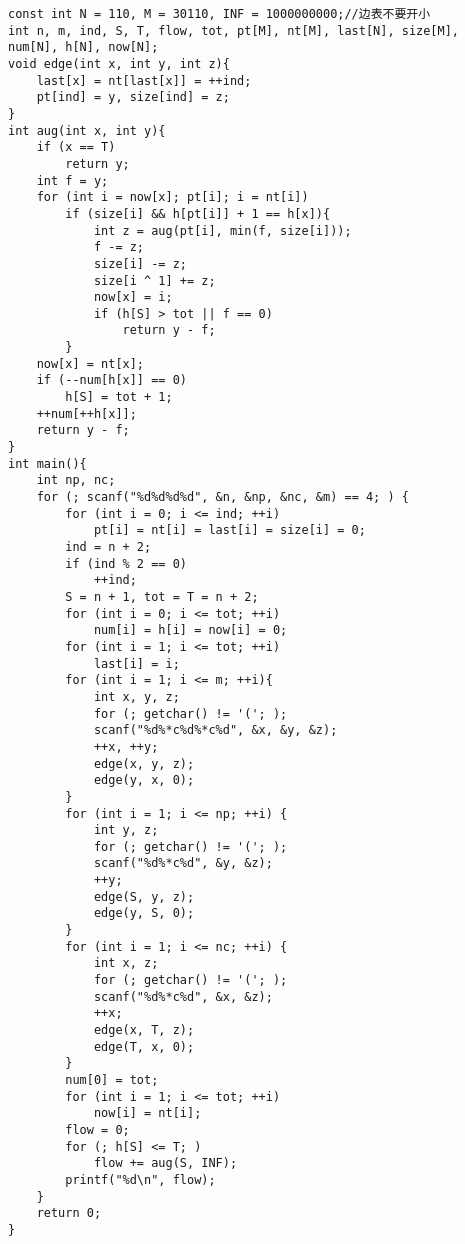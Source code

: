 \begin{lstlisting}
const int N = 110, M = 30110, INF = 1000000000;//边表不要开小
int n, m, ind, S, T, flow, tot, pt[M], nt[M], last[N], size[M], num[N], h[N], now[N];
void edge(int x, int y, int z){
	last[x] = nt[last[x]] = ++ind;
	pt[ind] = y, size[ind] = z;
}
int aug(int x, int y){
	if (x == T)
		return y;
	int f = y;
	for (int i = now[x]; pt[i]; i = nt[i])
		if (size[i] && h[pt[i]] + 1 == h[x]){
			int z = aug(pt[i], min(f, size[i]));
			f -= z;
			size[i] -= z;
			size[i ^ 1] += z;
			now[x] = i;
			if (h[S] > tot || f == 0)
				return y - f;
		}
	now[x] = nt[x];
	if (--num[h[x]] == 0)
		h[S] = tot + 1;
	++num[++h[x]];
	return y - f;
}
int main(){
	int np, nc;
	for (; scanf("%d%d%d%d", &n, &np, &nc, &m) == 4; ) {
		for (int i = 0; i <= ind; ++i)
			pt[i] = nt[i] = last[i] = size[i] = 0;
		ind = n + 2;
		if (ind % 2 == 0)
			++ind;
		S = n + 1, tot = T = n + 2;
		for (int i = 0; i <= tot; ++i)
			num[i] = h[i] = now[i] = 0;
		for (int i = 1; i <= tot; ++i)
			last[i] = i;
		for (int i = 1; i <= m; ++i){
			int x, y, z;
			for (; getchar() != '('; );
			scanf("%d%*c%d%*c%d", &x, &y, &z);
			++x, ++y;
			edge(x, y, z);
			edge(y, x, 0);
		}
		for (int i = 1; i <= np; ++i) {
			int y, z;
			for (; getchar() != '('; );
			scanf("%d%*c%d", &y, &z);
			++y;
			edge(S, y, z);
			edge(y, S, 0);
		}
		for (int i = 1; i <= nc; ++i) {
			int x, z;
			for (; getchar() != '('; );
			scanf("%d%*c%d", &x, &z);
			++x;
			edge(x, T, z);
			edge(T, x, 0);
		}
		num[0] = tot;
		for (int i = 1; i <= tot; ++i)
			now[i] = nt[i];
		flow = 0;
		for (; h[S] <= T; )
			flow += aug(S, INF);
		printf("%d\n", flow);
	}
	return 0;
}
\end{lstlisting}

